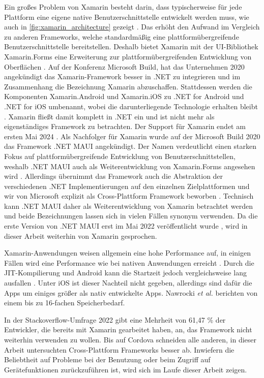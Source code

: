 Ein großes Problem von Xamarin besteht darin, dass typischerweise für jede Plattform eine eigene native Benutzerschnittstelle entwickelt werden muss, wie auch in \autoref{fig:xamarin_architecture} gezeigt \cite{Xamarin_Homepage}.
Das erhöht den Aufwand im Vergleich zu anderen Frameworks, welche standardmäßig eine plattformübergreifende Benutzerschnittstelle bereitstellen.
Deshalb bietet Xamarin mit der \ac{UI}-Bibliothek Xamarin.Forms eine Erweiterung zur plattformübergreifenden Entwicklung von Oberflächen \cite{Xamarin_Homepage}.
Auf der Konferenz Microsoft Build, hat das Unternehmen 2020 angekündigt das Xamarin-Framework besser in .NET zu integrieren und im Zusammenhang die Bezeichnung Xamarin abzuschaffen.
Stattdessen werden die Komponenten Xamarin.Android und Xamarin.iOS zu .NET for Android und .NET for iOS umbenannt, wobei die darunterliegende Technologie erhalten bleibt \cite{MS_Build_2020}.
Xamarin fließt damit komplett in .NET ein und ist nicht mehr als eigenständiges Framework zu betrachten.
Der Support für Xamarin endet am ersten Mai 2024 \cite{Xamarin_EOL}.
Als Nachfolger für Xamarin wurde auf der Microsoft Build 2020 das Framework .NET \ac{MAUI} angekündigt.
Der Namen verdeutlicht einen starken Fokus auf plattformübergreifende Entwicklung von Benutzerschnittstellen, weshalb .NET \ac{MAUI} auch als Weiterentwicklung von Xamarin.Forms angesehen wird \cite{NET_MAUI_Introduction}.
Allerdings übernimmt das Framework auch die Abstraktion der verschiedenen .NET Implementierungen auf den einzelnen Zielplattformen und wir von Microsoft explizit als Cross-Plattform Framework beworben \cite{NET_MAUI}.
Technisch kann .NET \ac{MAUI} daher als Weiterentwicklung von Xamarin betrachtet werden und beide Bezeichnungen lassen sich in vielen Fällen synonym verwenden.
Da die erste Version von .NET \ac{MAUI} erst im Mai 2022 veröffentlicht wurde \cite{NET_MAUI_Release}, wird in dieser Arbeit weiterhin von Xamarin gesprochen.


Xamarin-Anwendungen weisen allgemein eine hohe Performance auf, in einigen Fällen wird eine Performance wie bei nativen Anwendungen erreicht \cite{Nawrocki_Comparison_Hybrid_Native_Frameworks, Bakker_Xamarin_XamarinForms_Native, Xamarin_Homepage}.
Durch die \ac{JIT}-Kompilierung und Android kann die Startzeit jedoch vergleichsweise lang ausfallen \cite{Willocx_CrossPlatform_Performance}.
Unter iOS ist dieser Nachteil nicht gegeben, allerdings sind dafür die Apps um einiges größer als nativ entwickelte Apps.
Nawrocki \textit{et al.} \cite{Nawrocki_Comparison_Hybrid_Native_Frameworks} berichten von einem bis zu 16-fachen Speicherbedarf.

In der Stackoverflow-Umfrage 2022 \cite{Stackoverflow_2022} gibt eine Mehrheit von 61,47 \% der Entwickler, die bereits mit Xamarin gearbeitet haben, an, das Framework nicht weiterhin verwenden zu wollen.
Bis auf Cordova schneiden alle anderen, in dieser Arbeit untersuchten Cross-Plattform Frameworks besser ab.
Inwiefern die Beliebtheit auf Probleme bei der Benutzung oder beim Zugriff auf Gerätefunktionen zurückzuführen ist, wird sich im Laufe dieser Arbeit zeigen.